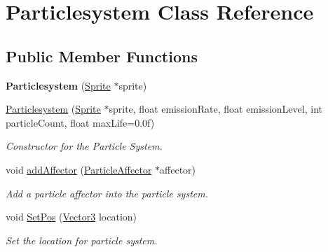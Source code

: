 \hypertarget{class_particlesystem}{}\section{Particlesystem Class Reference}
\label{class_particlesystem}
\subsection*{Public Member Functions}
\begin{DoxyCompactItemize}
\item 
\mbox{\label{class_particlesystem_a269b86f194b90cac301a302cc729bf25}} 
{\bfseries Particlesystem} (\mbox{\hyperlink{class_sprite}{Sprite}} $\ast$sprite)
\item 
\mbox{\label{class_particlesystem_a1bad47872a55fa997546ecbdeeff23be}} 
\mbox{\hyperlink{class_particlesystem_a1bad47872a55fa997546ecbdeeff23be}{Particlesystem}} (\mbox{\hyperlink{class_sprite}{Sprite}} $\ast$sprite, float emission\+Rate, float emission\+Level, int particle\+Count, float max\+Life=0.\+0f)
\begin{DoxyCompactList}\small\item\em Constructor for the Particle System. \end{DoxyCompactList}\item 
\mbox{\label{class_particlesystem_a7cb7b6f716c5dc5247db9641380dbaad}} 
void \mbox{\hyperlink{class_particlesystem_a7cb7b6f716c5dc5247db9641380dbaad}{add\+Affector}} (\mbox{\hyperlink{class_particle_affector}{Particle\+Affector}} $\ast$affector)
\begin{DoxyCompactList}\small\item\em Add a particle affector into the particle system. \end{DoxyCompactList}\item 
\mbox{\label{class_particlesystem_acb511af57e48902ce229ba363d8bf4f4}} 
void \mbox{\hyperlink{class_particlesystem_acb511af57e48902ce229ba363d8bf4f4}{Set\+Pos}} (\mbox{\hyperlink{class_vector3}{Vector3}} location)
\begin{DoxyCompactList}\small\item\em Set the location for particle system. \end{DoxyCompactList}\item 

\end{DoxyCompactItemize}
